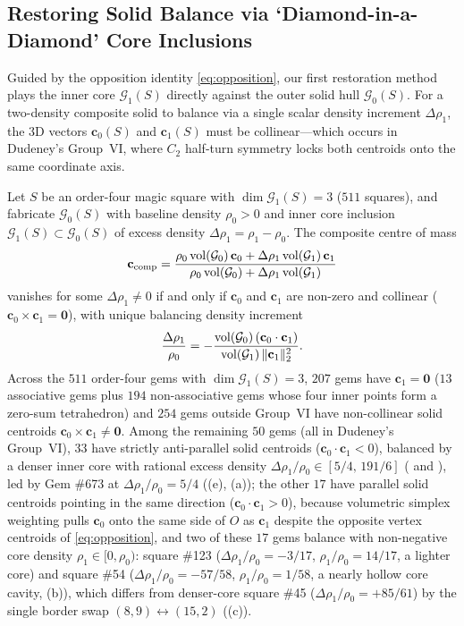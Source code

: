 \subsection{Restoring Solid Balance via `Diamond-in-a-Diamond' Core Inclusions}

Guided by the opposition identity \eqref{eq:opposition}, our first restoration method plays the inner core $\mathcal G_1(S)$ directly against the outer solid hull $\mathcal G_0(S)$. For a two-density composite solid to balance via a single scalar density increment $\Delta\rho_1$, the 3D vectors $\mathbf c_0(S)$ and $\mathbf c_1(S)$ must be collinear—which occurs in Dudeney's Group~VI, where $C_2$ half-turn symmetry locks both centroids onto the same coordinate axis.

\begin{theorem}
\label{thm:diamond-balance}
Let $S$ be an order-four magic square with $\dim\mathcal G_1(S)=3$ ($511$ squares), and fabricate $\mathcal G_0(S)$ with baseline density $\rho_0>0$ and inner core inclusion $\mathcal G_1(S)\subset\mathcal G_0(S)$ of excess density $\Delta\rho_1=\rho_1-\rho_0$. The composite centre of mass
\[
\mathbf c_{\mathrm{comp}} = \frac{\rho_0\operatorname{vol}(\mathcal G_0)\,\mathbf c_0 + \Delta\rho_1\operatorname{vol}(\mathcal G_1)\,\mathbf c_1}{\rho_0\operatorname{vol}(\mathcal G_0) + \Delta\rho_1\operatorname{vol}(\mathcal G_1)}
\]
vanishes for some $\Delta\rho_1\ne0$ if and only if $\mathbf c_0$ and $\mathbf c_1$ are non-zero and collinear ($\mathbf c_0\times\mathbf c_1=\mathbf 0$), with unique balancing density increment
\begin{equation}
\label{eq:density-ratio}
\frac{\Delta\rho_1}{\rho_0} = -\frac{\operatorname{vol}(\mathcal G_0)\,(\mathbf c_0\cdot\mathbf c_1)}{\operatorname{vol}(\mathcal G_1)\,\|\mathbf c_1\|_2^2}.
\end{equation}
Across the $511$ order-four gems with $\dim\mathcal G_1(S)=3$, $207$ gems have $\mathbf c_1=\mathbf 0$ ($13$ associative gems plus $194$ non-associative gems whose four inner points form a zero-sum tetrahedron) and $254$ gems outside Group~VI have non-collinear solid centroids $\mathbf c_0\times\mathbf c_1\ne\mathbf 0$. Among the remaining $50$ gems (all in Dudeney's Group~VI), $33$ have strictly anti-parallel solid centroids ($\mathbf c_0\cdot\mathbf c_1<0$), balanced by a denser inner core with rational excess density $\Delta\rho_1/\rho_0\in[5/4,\,191/6]$ ( and ), led by Gem \#673 at $\Delta\rho_1/\rho_0=5/4$ ((e), (a)); the other $17$ have parallel solid centroids pointing in the same direction ($\mathbf c_0\cdot\mathbf c_1>0$), because volumetric simplex weighting pulls $\mathbf c_0$ onto the same side of $O$ as $\mathbf c_1$ despite the opposite vertex centroids of \eqref{eq:opposition}, and two of these $17$ gems balance with non-negative core density $\rho_1\in[0,\rho_0)$: square \#123 ($\Delta\rho_1/\rho_0=-3/17$, $\rho_1/\rho_0=14/17$, a lighter core) and square \#54 ($\Delta\rho_1/\rho_0=-57/58$, $\rho_1/\rho_0=1/58$, a nearly hollow core cavity, (b)), which differs from denser-core square \#45 ($\Delta\rho_1/\rho_0=+85/61$) by the single border swap $(8,9)\leftrightarrow(15,2)$ ((c)).


\end{theorem}
